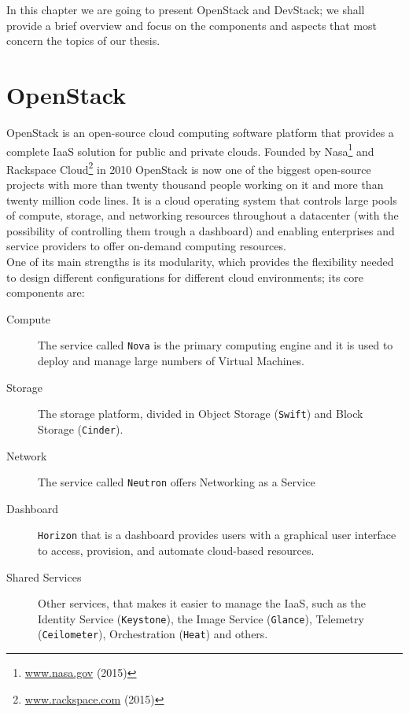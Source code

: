 

In this chapter we are going to present OpenStack and DevStack; we shall provide a brief overview and focus on the components and aspects that most concern the topics of our thesis.

\section{OpenStack}
\label{sec:openstack}
OpenStack is an open-source cloud computing software platform that provides a complete IaaS solution for public and private clouds. Founded by Nasa\footnote{\url{www.nasa.gov} (2015)} and Rackspace Cloud\footnote{\url{www.rackspace.com} (2015)} in 2010 OpenStack is now one of the biggest open-source projects with more than twenty thousand people working on it and more than twenty million code lines. It is a cloud operating system that controls large pools of compute, storage, and networking resources throughout a datacenter (with the possibility of controlling them trough a dashboard) and enabling enterprises and service providers to offer on-demand computing resources.\\
One of its main strengths is its modularity, which provides the flexibility needed to design different configurations for different cloud environments; its core components are:
\begin{description}
	\item[Compute] The service called \texttt{Nova} is the primary computing engine and it is used to deploy and manage large numbers of Virtual Machines.
	\item[Storage] The storage platform, divided in Object Storage (\texttt{Swift}) and Block Storage (\texttt{Cinder}).
	\item[Network] The service called \texttt{Neutron} offers Networking as a Service
	\item[Dashboard] \texttt{Horizon} that is a dashboard provides users with a graphical user interface to access, provision, and automate cloud-based resources.
	\item[Shared Services] Other services, that makes it easier to manage the IaaS, such as the Identity Service (\texttt{Keystone}), the Image Service (\texttt{Glance}), Telemetry (\texttt{Ceilometer}), Orchestration (\texttt{Heat}) and others.
\end{description}

